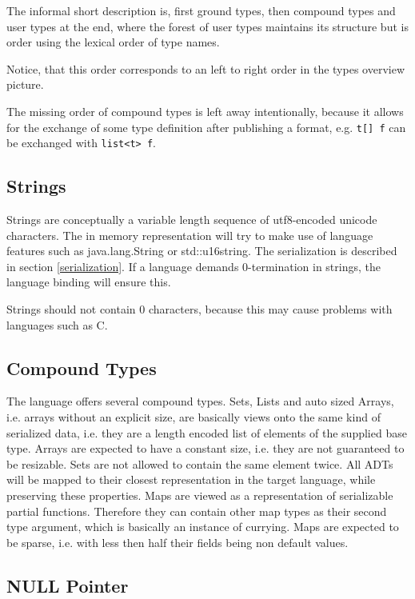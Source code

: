 The informal short description is, first ground types, then compound types and user types at the end, where the forest of user types maintains its structure but is order using the lexical order of type names.

Notice, that this order corresponds to an left to right order in the types overview picture.

The missing order of compound types is left away intentionally, because it allows for the exchange of some type definition after publishing a format, e.g. \verb/t[] f/ can be exchanged with \verb/list<t> f/.


\subsection{Strings}

Strings are conceptually a variable length sequence of utf8-encoded unicode characters. The in memory representation will try to make use of language features such as java.lang.String or std::u16string. The serialization is described in section \ref{serialization}. If a language demands 0-termination in strings, the language binding will ensure this.

Strings should not contain 0 characters, because this may cause problems with languages such as C.


\subsection{Compound Types}

The language offers several compound types. Sets, Lists and auto sized Arrays, i.e. arrays without an explicit size, are basically views onto the same kind of serialized data, i.e. they are a length encoded list of elements of the supplied base type. Arrays are expected to have a constant size, i.e. they are not guaranteed to be resizable. Sets are not allowed to contain the same element twice.
All ADTs will be mapped to their closest representation in the target language, while preserving these properties.
Maps are viewed as a representation of serializable partial functions. Therefore they can contain other map types as their second type argument, which is basically an instance of currying. Maps are expected to be sparse, i.e. with less then half their fields being non default values.

\subsection{NULL Pointer}

